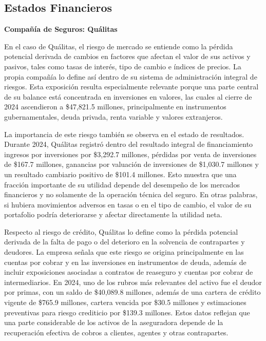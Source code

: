 \subsection{Estados Financieros}


\textbf{Compañía de Seguros: Quálitas}

En el caso de Quálitas, el riesgo de mercado se entiende como la pérdida potencial derivada de cambios en factores que afectan el valor de sus activos y pasivos, tales como tasas de interés, tipo de cambio e índices de precios. La propia compañía lo define así dentro de su sistema de administración integral de riesgos. Esta exposición resulta especialmente relevante porque una parte central de su balance está concentrada en inversiones en valores, las cuales al cierre de 2024 ascendieron a \$47{,}821.5 millones, principalmente en instrumentos gubernamentales, deuda privada, renta variable y valores extranjeros.

La importancia de este riesgo también se observa en el estado de resultados. Durante 2024, Quálitas registró dentro del resultado integral de financiamiento ingresos por inversiones por \$3{,}292.7 millones, pérdidas por venta de inversiones de \$167.7 millones, ganancias por valuación de inversiones de \$1{,}030.7 millones y un resultado cambiario positivo de \$101.4 millones. Esto muestra que una fracción importante de su utilidad depende del desempeño de los mercados financieros y no solamente de la operación técnica del seguro. En otras palabras, si hubiera movimientos adversos en tasas o en el tipo de cambio, el valor de su portafolio podría deteriorarse y afectar directamente la utilidad neta.

Respecto al riesgo de crédito, Quálitas lo define como la pérdida potencial derivada de la falta de pago o del deterioro en la solvencia de contrapartes y deudores. La empresa señala que este riesgo se origina principalmente en las cuentas por cobrar y en las inversiones en instrumentos de deuda, además de incluir exposiciones asociadas a contratos de reaseguro y cuentas por cobrar de intermediarios. En 2024, uno de los rubros más relevantes del activo fue el deudor por primas, con un saldo de \$40{,}089.8 millones, además de una cartera de crédito vigente de \$765.9 millones, cartera vencida por \$30.5 millones y estimaciones preventivas para riesgo crediticio por \$139.3 millones. Estos datos reflejan que una parte considerable de los activos de la aseguradora depende de la recuperación efectiva de cobros a clientes, agentes y otras contrapartes.

